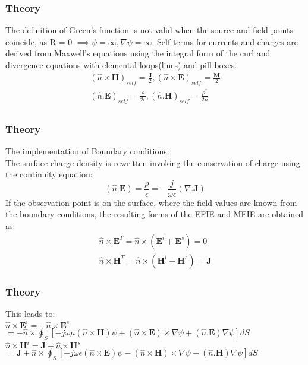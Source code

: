\documentclass{beamer}
\begin{document}
\begin{frame}
\frametitle{Theory}
The definition of Green's function is not valid when the source and field points coincide, as R = 0 $\implies \psi =\infty, \nabla\psi=\infty$. Self terms for currents and charges are derived from Maxwell's equations using the integral form of the curl and divergence equations with elemental loops(lines) and pill boxes.
\begin{eqnarray}
(\hat{n}\times\textbf{H})_{self} = \frac{\textbf{J}}{2},(\hat{n}\times\textbf{E})_{self} = \frac{\textbf{M}}{2} \\
(\hat{n}.\textbf{E})_{self} = \frac{\rho}{2\epsilon},(\hat{n}.\textbf{H})_{self} = \frac{\rho^*}{2\mu}\\
\end{eqnarray}
\end{frame}
\begin{frame}
\frametitle{Theory}
The implementation of Boundary conditions: \\
The surface charge density is rewritten invoking the conservation of charge using the continuity equation:
\begin{equation}
(\hat{n}.\textbf{E}) = \frac{\rho}{\epsilon} = -\frac{j}{\omega\epsilon}(\nabla.\textbf{J})
\end{equation}
If the observation point is on the surface, where the field values are known from the boundary conditions, the resulting forms of the EFIE and MFIE are obtained as:
\begin{eqnarray}
\hat{n}\times\textbf{E}^T = \hat{n}\times(\textbf{E}^i + \textbf{E}^s) = 0 \\
\hat{n}\times\textbf{H}^T = \hat{n}\times(\textbf{H}^i + \textbf{H}^s) = \textbf{J}
\end{eqnarray}
\end{frame}
\begin{frame}
\frametitle{Theory}
This leads to: \\
$\hat{n}\times\textbf{E}^i=-\hat{n}\times\textbf{E}^s $\\
$=-\hat{n}\times\oint_S[-j\omega\mu(\hat{n}\times\textbf{H})\psi + (\hat{n}\times\textbf{E})\times\nabla\psi + (\hat{n}.\textbf{E})\nabla\psi]dS$\\
$\hat{n}\times\textbf{H}^i = \textbf{J} -\hat{n}\times\textbf{H}^s$\\
$ =\textbf{J} + \hat{n}\times\oint_S[-j\omega\epsilon(\hat{n}\times\textbf{E})\psi - (\hat{n}\times\textbf{H})\times\nabla\psi + (\hat{n}.\textbf{H})\nabla\psi]dS$
\end{frame}
\end{document}
